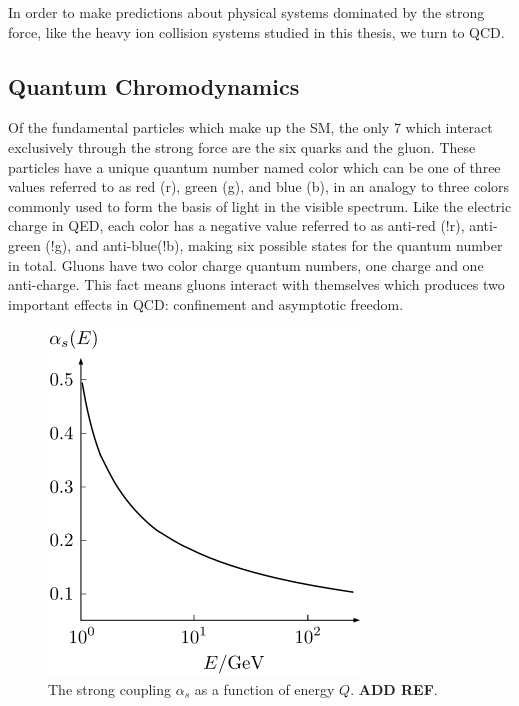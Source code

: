 In order to make predictions about physical systems dominated by the strong force, like the heavy ion collision systems studied in this thesis, we turn to QCD. 

\subsection{Quantum Chromodynamics}
Of the fundamental particles which make up the SM, the only 7 which interact exclusively through the strong force are the six quarks and the gluon. 
These particles have a unique quantum number named color which can be one of three values referred to as
red (r), green (g), and blue (b), in an analogy to three colors commonly used to form the basis of light in the visible spectrum. Like the electric
charge in QED, each color has a negative value
 referred to as anti-red (!r), anti-green (!g), and anti-blue(!b), making six possible states for the quantum number in total. Gluons have two color charge quantum numbers, one charge and one anti-charge. This fact means gluons interact with themselves which produces two important effects in QCD: confinement and asymptotic freedom.

\begin{figure}[!ht]
\begin{center}
\includegraphics[width=0.45\linewidth]{figs/coupling_constant.png}
\caption{The strong coupling $\alpha_s$ as a function of energy $Q$. \textbf{ADD REF}.}
\end{center}
\label{fig:coupling_plot}
\end{figure}

